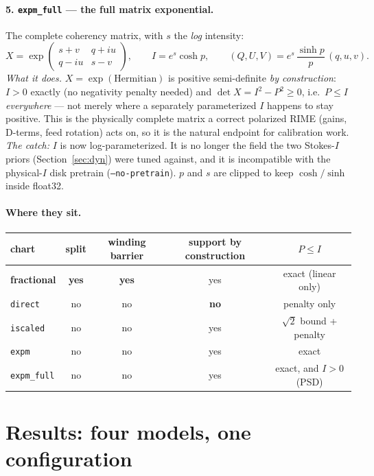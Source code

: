 \documentclass[11pt]{article}
\begin{document}
\paragraph{5. \texttt{expm\_full} --- the full matrix exponential.}
The complete coherency matrix, with $s$ the \emph{log} intensity:
\begin{equation}
  X = \exp\!\begin{pmatrix} s+v & q+iu \\ q-iu & s-v \end{pmatrix},
  \qquad
  I = e^{s}\cosh p, \qquad (Q,U,V) = e^{s}\,\frac{\sinh p}{p}\,(q,u,v).
\end{equation}
\emph{What it does.} $X=\exp(\text{Hermitian})$ is positive semi-definite \emph{by
construction}: $I>0$ exactly (no negativity penalty needed) and
$\det X = I^2-P^2\ge0$, i.e.\ $P\le I$ \emph{everywhere} --- not merely where a separately
parameterized $I$ happens to stay positive. This is the physically complete matrix a
correct polarized RIME (gains, D-terms, feed rotation) acts on, so it is the natural
endpoint for calibration work. \emph{The catch:} $I$ is now log-parameterized. It is no
longer the field the two Stokes-$I$ priors (Section~\ref{sec:dyn}) were tuned against, and
it is incompatible with the physical-$I$ disk pretrain (\texttt{--no-pretrain}). $p$ and
$s$ are clipped to keep $\cosh/\sinh$ inside float32.

\paragraph{Where they sit.}
\begin{center}
\begin{tabular}{@{}lcccc@{}}
\toprule
chart & split & winding barrier & support by construction & $P\le I$ \\
\midrule
\textbf{fractional} & \textbf{yes} & \textbf{yes} & yes & exact (linear only) \\
\texttt{direct}     & no  & no  & \textbf{no} & penalty only \\
\texttt{iscaled}    & no  & no  & yes & $\sqrt2$ bound + penalty \\
\texttt{expm}       & no  & no  & yes & exact \\
\texttt{expm\_full} & no  & no  & yes & exact, and $I>0$ (PSD) \\
\bottomrule
\end{tabular}
\end{center}

\section{Results: four models, one configuration}
\label{sec:results}
\end{document}
